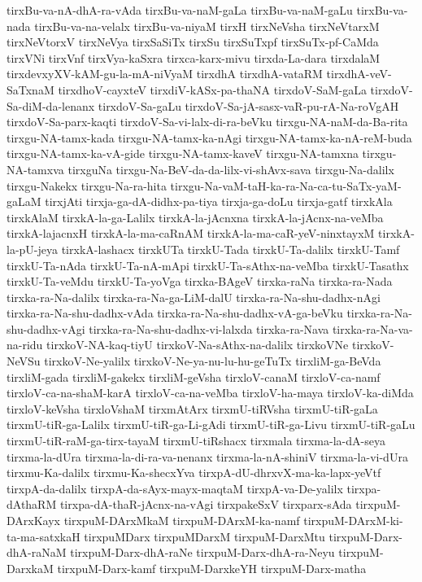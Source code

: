 {tirxBu-va-nA-dhA-ra-vAda
tirxBu-va-naM-gaLa
tirxBu-va-naM-gaLu
tirxBu-va-nada
tirxBu-va-na-velalx
tirxBu-va-niyaM
tirxH
tirxNeVsha
tirxNeVtarxM
tirxNeVtorxV
tirxNeVya
tirxSaSiTx
tirxSu
tirxSuTxpf
tirxSuTx-pf-CaMda
tirxVNi
tirxVnf
tirxVya-kaSxra
tirxca-karx-mivu
tirxda-La-dara
tirxdalaM
tirxdevxyXV-kAM-gu-la-mA-niVyaM
tirxdhA
tirxdhA-vataRM
tirxdhA-veV-SaTxnaM
tirxdhoV-cayxteV
tirxdiV-kASx-pa-thaNA
tirxdoV-SaM-gaLa
tirxdoV-Sa-diM-da-lenanx
tirxdoV-Sa-gaLu
tirxdoV-Sa-jA-sasx-vaR-pu-rA-Na-roVgAH
tirxdoV-Sa-parx-kaqti
tirxdoV-Sa-vi-lalx-di-ra-beVku
tirxgu-NA-naM-da-Ba-rita
tirxgu-NA-tamx-kada
tirxgu-NA-tamx-ka-nAgi
tirxgu-NA-tamx-ka-nA-reM-buda
tirxgu-NA-tamx-ka-vA-gide
tirxgu-NA-tamx-kaveV
tirxgu-NA-tamxna
tirxgu-NA-tamxva
tirxguNa
tirxgu-Na-BeV-da-da-lilx-vi-shAvx-sava
tirxgu-Na-dalilx
tirxgu-Nakekx
tirxgu-Na-ra-hita
tirxgu-Na-vaM-taH-ka-ra-Na-ca-tu-SaTx-yaM-gaLaM
tirxjAti
tirxja-ga-dA-didhx-pa-tiya
tirxja-ga-doLu
tirxja-gatf
tirxkAla
tirxkAlaM
tirxkA-la-ga-Lalilx
tirxkA-la-jAcnxna
tirxkA-la-jAcnx-na-veMba
tirxkA-lajacnxH
tirxkA-la-ma-caRnAM
tirxkA-la-ma-caR-yeV-ninxtayxM
tirxkA-la-pU-jeya
tirxkA-lashacx
tirxkUTa
tirxkU-Tada
tirxkU-Ta-dalilx
tirxkU-Tamf
tirxkU-Ta-nAda
tirxkU-Ta-nA-mApi
tirxkU-Ta-sAthx-na-veMba
tirxkU-Tasathx
tirxkU-Ta-veMdu
tirxkU-Ta-yoVga
tirxka-BAgeV
tirxka-raNa
tirxka-ra-Nada
tirxka-ra-Na-dalilx
tirxka-ra-Na-ga-LiM-dalU
tirxka-ra-Na-shu-dadhx-nAgi
tirxka-ra-Na-shu-dadhx-vAda
tirxka-ra-Na-shu-dadhx-vA-ga-beVku
tirxka-ra-Na-shu-dadhx-vAgi
tirxka-ra-Na-shu-dadhx-vi-lalxda
tirxka-ra-Nava
tirxka-ra-Na-va-na-ridu
tirxkoV-NA-kaq-tiyU
tirxkoV-Na-sAthx-na-dalilx
tirxkoVNe
tirxkoV-NeVSu
tirxkoV-Ne-yalilx
tirxkoV-Ne-ya-nu-lu-hu-geTuTx
tirxliM-ga-BeVda
tirxliM-gada
tirxliM-gakekx
tirxliM-geVsha
tirxloV-canaM
tirxloV-ca-namf
tirxloV-ca-na-shaM-karA
tirxloV-ca-na-veMba
tirxloV-ha-maya
tirxloV-ka-diMda
tirxloV-keVsha
tirxloVshaM
tirxmAtArx
tirxmU-tiRVsha
tirxmU-tiR-gaLa
tirxmU-tiR-ga-Lalilx
tirxmU-tiR-ga-Li-gAdi
tirxmU-tiR-ga-Livu
tirxmU-tiR-gaLu
tirxmU-tiR-raM-ga-tirx-tayaM
tirxmU-tiRshacx
tirxmala
tirxma-la-dA-seya
tirxma-la-dUra
tirxma-la-di-ra-va-nenanx
tirxma-la-nA-shiniV
tirxma-la-vi-dUra
tirxmu-Ka-dalilx
tirxmu-Ka-shecxYva
tirxpA-dU-dhrxvX-ma-ka-lapx-yeVtf
tirxpA-da-dalilx
tirxpA-da-sAyx-mayx-maqtaM
tirxpA-va-De-yalilx
tirxpa-dAthaRM
tirxpa-dA-thaR-jAcnx-na-vAgi
tirxpakeSxV
tirxparx-sAda
tirxpuM-DArxKayx
tirxpuM-DArxMkaM
tirxpuM-DArxM-ka-namf
tirxpuM-DArxM-ki-ta-ma-satxkaH
tirxpuMDarx
tirxpuMDarxM
tirxpuM-DarxMtu
tirxpuM-Darx-dhA-raNaM
tirxpuM-Darx-dhA-raNe
tirxpuM-Darx-dhA-ra-Neyu
tirxpuM-DarxkaM
tirxpuM-Darx-kamf
tirxpuM-DarxkeYH
tirxpuM-Darx-matha
}
